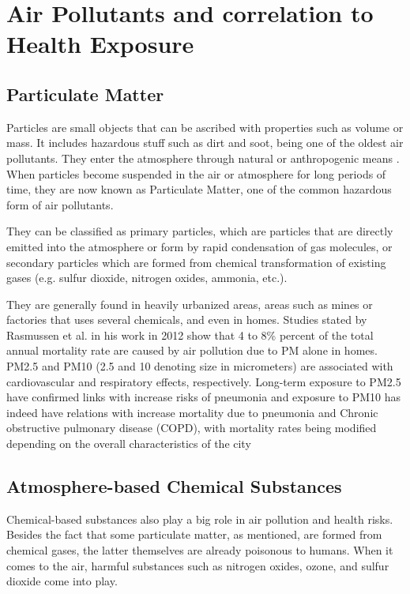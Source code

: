 \documentclass[10pt,11pt,12pt,oneside]{book}
\begin{document}
    \section{Air Pollutants and correlation to Health Exposure}
        \subsection{Particulate Matter}
        Particles are small objects that can be ascribed with properties such as volume or mass. It includes hazardous stuff such as dirt and soot, being one of the oldest air pollutants. They enter the atmosphere through natural or anthropogenic means \cite{knudsen2012particulate}. When particles become suspended in the air or atmosphere for long periods of time, they are now known as Particulate Matter, one of the common hazardous form of air pollutants.

        They can be classified as primary particles, which are particles that are directly emitted into the atmosphere or form by rapid condensation of gas molecules, or secondary particles which are formed from chemical transformation of existing gases (e.g. sulfur dioxide, nitrogen oxides, ammonia, etc.). \cite{finlayson2000chemistry}

        They are generally found in heavily urbanized areas, areas such as mines or factories that uses several chemicals, and even in homes. Studies stated by Rasmussen et al. in his work in 2012 show that 4 to 8\% percent of the total annual mortality rate are caused by air pollution due to PM alone in homes. PM2.5 and PM10 (2.5 and 10 denoting size in micrometers) are associated with cardiovascular and respiratory effects, respectively. Long-term exposure to PM2.5 have confirmed links with increase risks of pneumonia \cite{Neupane2010} and exposure to PM10 has indeed have relations with increase mortality due to pneumonia and Chronic obstructive pulmonary disease (COPD), with mortality rates being modified depending on the overall characteristics of the city \cite{MedinaRamn2006}
        \subsection{Atmosphere-based Chemical Substances}
        Chemical-based substances also play a big role in air pollution and health risks. Besides the fact that some particulate matter, as mentioned, are formed from chemical gases, the latter themselves are already poisonous to humans. When it comes to the air, harmful substances such as nitrogen oxides, ozone, and sulfur dioxide come into play.
\end{document}

